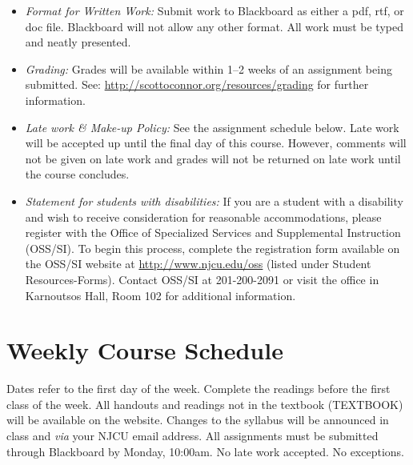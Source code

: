 \documentclass[article,oneside]{memoir}
\begin{document}
\begin{itemize}
\item \textit{Format for Written Work:} Submit work to Blackboard as either a pdf, rtf, or doc file. Blackboard will not allow any other format. All work must be typed and neatly presented. 


\item \textit{Grading:} Grades will be available within 1--2 weeks of an assignment being submitted. See: \href{http://scottoconnor.org/resources/grading}{http://scottoconnor.org/resources/grading} for further information.





\item \textit{Late work \& Make-up Policy:} See the assignment schedule below. Late work will be accepted up until the final day of this course. However, comments will not be given on late work and grades will not be returned on late work until the course concludes. 

\item \textit{Statement for students with disabilities:} If you are a student
with a disability and wish to receive consideration for reasonable
accommodations, please register with the Office of Specialized Services
and Supplemental Instruction (OSS/SI). To begin this process, complete
the registration form available on the OSS/SI website at
\href{http://www.njcu.edu/oss}{http://www.njcu.edu/oss}
(listed under Student Resources-Forms). Contact OSS/SI at 201-200-2091
or visit the office in Karnoutsos Hall, Room 102 for additional
information.




\end{itemize}



\section{Weekly Course Schedule}
Dates refer to the first day of the week. Complete the readings before the first class of the week. All handouts and readings not in the textbook (TEXTBOOK) will be available on the website. Changes to the syllabus will be announced in class and \emph{via} your NJCU email address. All assignments must be submitted through Blackboard by Monday, 10:00am. No late work accepted. No exceptions. 
\end{document}
